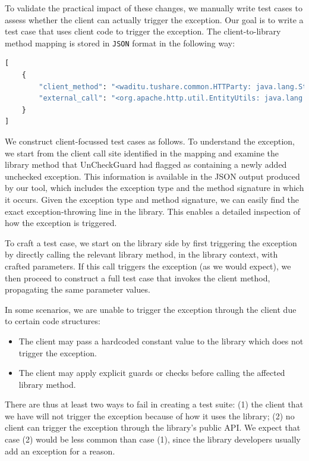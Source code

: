 To validate the practical impact of these changes, we manually write test cases to assess whether the client can actually trigger the exception. Our goal is to write a test case that uses client code to trigger the exception. The client-to-library method mapping is stored in \texttt{JSON} format in the following way:

\begin{lstlisting}[language=python]
[
    {
        "client_method": "<waditu.tushare.common.HTTParty: java.lang.String get(java.lang.String,java.lang.String)>",
        "external_call": "<org.apache.http.util.EntityUtils: java.lang.String toString(org.apache.http.HttpEntity,java.lang.String)>"
    }
]
\end{lstlisting}

We construct client-focussed test cases as follows. To understand the exception, we start from the client call site identified in the mapping and examine the library method that UnCheckGuard had flagged as containing a newly added unchecked exception. This information is available in the JSON output produced by our tool, which includes the exception type and the method signature in which it occurs. Given the exception type and method signature, we can easily find the exact exception-throwing line in the library. This enables a detailed inspection of how the exception is triggered.

To craft a test case, we start on the library side by first triggering the exception by directly calling the relevant library method, in the library context, with crafted parameters. If this call triggers the exception (as we would expect), we then proceed to construct a full test case that invokes the client method, propagating the same parameter values.

In some scenarios, we are unable to trigger the exception through the client due to certain code structures:
\begin{itemize}
  \item The client may pass a hardcoded constant value to the library which does not trigger the exception.
  \item The client may apply explicit guards or checks before calling the affected library method.
\end{itemize}
There are thus at least two ways to fail in creating a test suite: (1) the client that we have will not trigger the exception because of how it uses the library; (2) no client can trigger the exception through the library's public API. We expect that case (2) would be less common than case (1), since the library developers usually add an exception for a reason.

